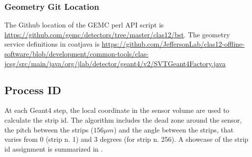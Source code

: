 \subsubsection{Geometry Git Location}
The Github location of the GEMC perl API script is \url{https://github.com/gemc/detectors/tree/master/clas12/bst}.
The geometry service definitions in coatjava is \url{https://github.com/JeffersonLab/clas12-offline-software/blob/development/common-tools/clas-jcsg/src/main/java/org/jlab/detector/geant4/v2/SVTGeant4Factory.java}


\subsection{Process ID}

At each Geant4 step, the local coordinate in the sensor volume are used to calculate the strip id.
The algorithm includes the dead zone around the sensor, the pitch between the strips ($156 \mu m$) and the angle
between the strips, that varies from 0 (strip n. 1) and 3 degrees (for strip n. 256). A showcase of the strip id assignment
is summarized in .

